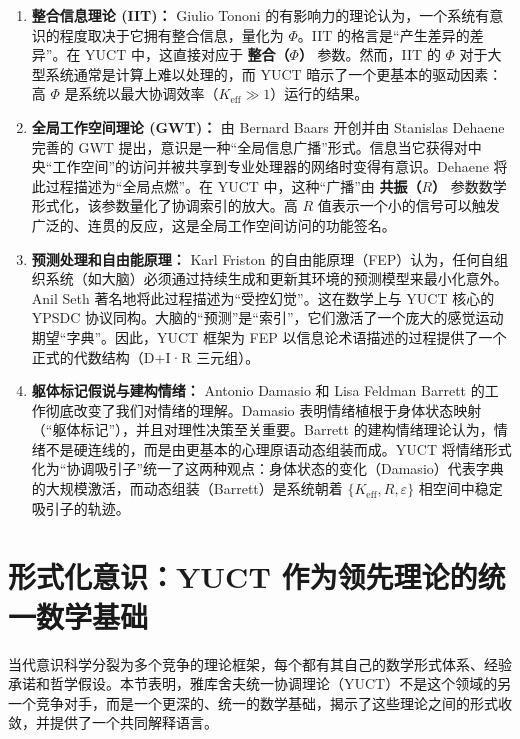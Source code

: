 \documentclass[12pt,a4paper]{article}
\begin{document}
	\begin{enumerate}
		\item \textbf{整合信息理论 (IIT)：} Giulio Tononi 的有影响力的理论认为，一个系统有意识的程度取决于它拥有整合信息，量化为 $\Phi$。IIT 的格言是“产生差异的差异”。在 YUCT 中，这直接对应于 \textbf{整合（\(\Phi\)）} 参数。然而，IIT 的 $\Phi$ 对于大型系统通常是计算上难以处理的，而 YUCT 暗示了一个更基本的驱动因素：高 $\Phi$ 是系统以最大协调效率（$K_{\mathrm{eff}} \gg 1$）运行的结果。
		
		\item \textbf{全局工作空间理论 (GWT)：} 由 Bernard Baars 开创并由 Stanislas Dehaene 完善的 GWT 提出，意识是一种“全局信息广播”形式。信息当它获得对中央“工作空间”的访问并被共享到专业处理器的网络时变得有意识。Dehaene 将此过程描述为“全局点燃”。在 YUCT 中，这种“广播”由 \textbf{共振（\(R\)）} 参数数学形式化，该参数量化了协调索引的放大。高 $R$ 值表示一个小的信号可以触发广泛的、连贯的反应，这是全局工作空间访问的功能签名。
		
		\item \textbf{预测处理和自由能原理：} Karl Friston 的自由能原理（FEP）认为，任何自组织系统（如大脑）必须通过持续生成和更新其环境的预测模型来最小化意外。Anil Seth 著名地将此过程描述为“受控幻觉”。这在数学上与 YUCT 核心的 YPSDC 协议同构。大脑的“预测”是“索引”，它们激活了一个庞大的感觉运动期望“字典”。因此，YUCT 框架为 FEP 以信息论术语描述的过程提供了一个正式的代数结构（D+I·R 三元组）。
		
		\item \textbf{躯体标记假说与建构情绪：} Antonio Damasio 和 Lisa Feldman Barrett 的工作彻底改变了我们对情绪的理解。Damasio 表明情绪植根于身体状态映射（“躯体标记”），并且对理性决策至关重要。Barrett 的建构情绪理论认为，情绪不是硬连线的，而是由更基本的心理原语动态组装而成。YUCT 将情绪形式化为“协调吸引子”统一了这两种观点：身体状态的变化（Damasio）代表字典的大规模激活，而动态组装（Barrett）是系统朝着 $\{K_{\mathrm{eff}}, R, \varepsilon\}$ 相空间中稳定吸引子的轨迹。
	\end{enumerate}
	
	\section{形式化意识：YUCT 作为领先理论的统一数学基础}
	
	当代意识科学分裂为多个竞争的理论框架，每个都有其自己的数学形式体系、经验承诺和哲学假设。本节表明，雅库舍夫统一协调理论（YUCT）不是这个领域的另一个竞争对手，而是一个更深的、统一的数学基础，揭示了这些理论之间的形式收敛，并提供了一个共同解释语言。
	
\end{document}
